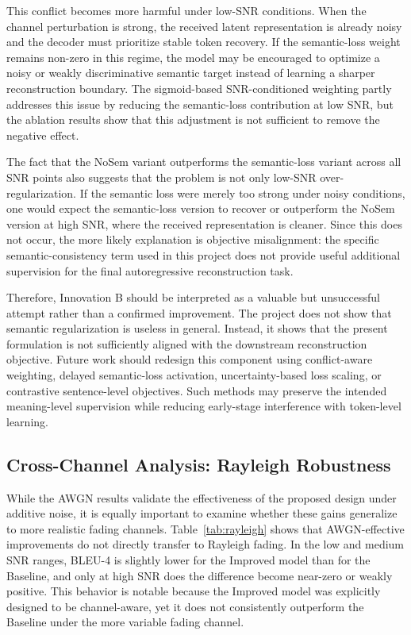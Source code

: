 This conflict becomes more harmful under low-SNR conditions. When the channel perturbation is strong, the received latent representation is already noisy and the decoder must prioritize stable token recovery. If the semantic-loss weight remains non-zero in this regime, the model may be encouraged to optimize a noisy or weakly discriminative semantic target instead of learning a sharper reconstruction boundary. The sigmoid-based SNR-conditioned weighting partly addresses this issue by reducing the semantic-loss contribution at low SNR, but the ablation results show that this adjustment is not sufficient to remove the negative effect.

The fact that the NoSem variant outperforms the semantic-loss variant across all SNR points also suggests that the problem is not only low-SNR over-regularization. If the semantic loss were merely too strong under noisy conditions, one would expect the semantic-loss version to recover or outperform the NoSem version at high SNR, where the received representation is cleaner. Since this does not occur, the more likely explanation is objective misalignment: the specific semantic-consistency term used in this project does not provide useful additional supervision for the final autoregressive reconstruction task.

Therefore, Innovation B should be interpreted as a valuable but unsuccessful attempt rather than a confirmed improvement. The project does not show that semantic regularization is useless in general. Instead, it shows that the present formulation is not sufficiently aligned with the downstream reconstruction objective. Future work should redesign this component using conflict-aware weighting, delayed semantic-loss activation, uncertainty-based loss scaling, or contrastive sentence-level objectives. Such methods may preserve the intended meaning-level supervision while reducing early-stage interference with token-level learning.

\FloatBarrier
\subsection{Cross-Channel Analysis: Rayleigh Robustness}

While the AWGN results validate the effectiveness of the proposed design under additive noise, it is equally important to examine whether these gains generalize to more realistic fading channels. Table~\ref{tab:rayleigh} shows that AWGN-effective improvements do not directly transfer to Rayleigh fading. In the low and medium SNR ranges, BLEU-4 is slightly lower for the Improved model than for the Baseline, and only at high SNR does the difference become near-zero or weakly positive. This behavior is notable because the Improved model was explicitly designed to be channel-aware, yet it does not consistently outperform the Baseline under the more variable fading channel.

